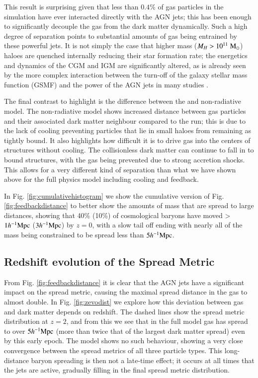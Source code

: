 This result is surprising given that less than $0.4\%$ of gas particles in
the simulation have ever interacted directly with the AGN jets; this has been
enough to significantly decouple the gas from the dark matter dynamically.
Such a high degree of separation points to substantial amounts of gas being
entrained by these powerful jets. It is not simply the case that higher mass
($M_H > 10^{11} \;{\rm M}_{\odot}{}$) haloes are quenched internally reducing their star
formation rate; the energetics and dynamics of the CGM and IGM are
significantly altered, as is already seen by the more complex interaction
between the turn-off of the galaxy stellar mass function (GSMF) and the power
of the AGN jets in many studies \citep{Weinberger2018, Dave2019}. 

The final contrast to highlight is the difference between the \nojet{} and
non-radiative model. The non-radiative model shows increased distance between
gas particles and their associated dark matter neighbour compared to the
\nojet{} run; this is due to the lack of cooling preventing particles that
lie in small haloes from remaining as tightly bound. It also highlights how
difficult it is to drive gas into the centers of structures without cooling.
The collisionless dark matter can continue to fall in to bound structures,
with the gas being prevented due to strong accretion shocks. This allows for
a very different kind of separation than what we have shown above for the
full physics model including cooling and feedback.


In Fig. \ref{fig:cumulativehistogram} we show the cumulative version of Fig.
\ref{fig:feedbackdistance} to better show the amounts of mass that are spread
to large distances, showing that 40\% (10\%) of cosmological baryons have
moved > $1h^{-1}{\rm Mpc}{}$ ($3h^{-1}{\rm Mpc}{}$) by $z = 0$, with a slow tail off ending with
nearly all of the mass being constrained to be spread less than $5h^{-1}{\rm Mpc}{}$.



\subsection{Redshift evolution of the Spread Metric}


From Fig. \ref{fig:feedbackdistance} it is clear that the AGN jets have a
significant impact on the spread metric, causing the maximal spread distance
in the gas to almost double. In Fig. \ref{fig:zevodist} we explore how this
deviation between gas and dark matter depends on redshift. The dashed lines
show the spread metric distribution at $z=2$, and from this we see that in
the full model gas has spread to over $5h^{-1}{\rm Mpc}{}$ (more than twice that of the
largest dark matter spread) even by this early epoch. The \nojet{} model
shows no such behaviour, showing a very close convergence between the spread
metrics of all three particle types. This long-distance baryon spreading is
then not a late-time effect; it occurs at all times that the jets are active,
gradually filling in the final spread metric distribution.
